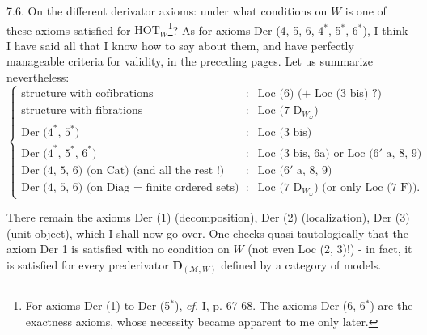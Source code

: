 7.6. On the different derivator axioms: under what conditions on $W$ is one of these axioms satisfied for $\mathrm{HOT}_W$\footnote[51]{For axioms Der (1) to Der (5$^*$), \textit{cf.} I, p. 67-68. The axioms Der (6, 6$^*$) are the exactness axioms, whose necessity became apparent to me only later.}? As for axioms Der (4, 5, 6, 4$^*$, 5$^*$, 6$^*$), I think I have said all that I know how to say about them, and have perfectly manageable criteria for validity, in the preceding pages. Let us summarize nevertheless: %
\[
\left\{
\begin{array}{lcl}
\text{structure with cofibrations} & : & \text{Loc (6) (+ Loc (3 bis) ?)} \\[1ex]
\text{structure with fibrations} & : & \text{Loc (7 }\mathrm{D}_{W_\omega}\text{)} \\[1ex]
\text{Der (4}^*\text{, 5}^*\text{)} & : & \text{Loc (3 bis)} \\[1ex]
\text{Der (4}^*\text{, 5}^*\text{, 6}^*\text{)} & : & \text{Loc (3 bis, 6a) or Loc (6}'\text{ a, 8, 9)} \\[1ex]
\text{Der (4, 5, 6) (on Cat) (and all the rest !)} & : & \text{Loc (6}'\text{ a, 8, 9)} \\[1ex]
\text{Der (4, 5, 6) (on Diag $=$ finite ordered sets)} & : & \text{Loc (7 }\mathrm{D}_{W_\omega}\text{) (or only Loc (7 F)).}
\end{array}
\right.
\]

There remain the axioms Der (1) (decomposition), Der (2) (localization), Der (3) (unit object), which I shall now go over. One checks
quasi-tautologically that the axiom Der 1 is satisfied with no condition on $W$ (not even Loc (2, 3)!) - in fact, it is satisfied for every prederivator $\mathbf{D}_{(\mathcal{M},W)}$ defined by a category of models.

